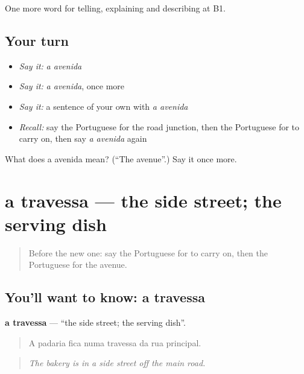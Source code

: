 \begin{grammarlens}[title={What you've built}]
One more word for telling, explaining and describing at B1.
\end{grammarlens}

\subsection*{Your turn}
\begin{itemize}
\raggedright
  \item \emph{Say it:} \emph{a avenida}
  \item \emph{Say it:} \emph{a avenida}, once more
  \item \emph{Say it:} a sentence of your own with \emph{a avenida}
  \item \emph{Recall:} say the Portuguese for the road junction, then the Portuguese for to carry on, then say \emph{a avenida} again
\end{itemize}

\begin{tcolorbox}[breakable,colback=teal!4,colframe=teal!35!black,title={Before you move on}]
What does a avenida mean? (\textquotedblleft{}The avenue\textquotedblright{}.) Say it once more.
\end{tcolorbox}
\section[a travessa]{a travessa — the side street; the serving dish}

\label{lesson:PT-C437-travessa}



\begin{quote}
Before the new one: say the Portuguese for to carry on, then the Portuguese for the avenue.
\end{quote}

\subsection*{You'll want to know: a travessa}
\textbf{a travessa} — \textquotedblleft{}the side street; the serving dish\textquotedblright{}.

\begin{quote}
A padaria fica numa travessa da rua principal.
\end{quote}

\begin{quote}
\emph{The bakery is in a side street off the main road.}
\end{quote}

